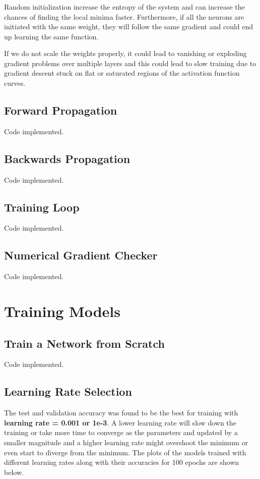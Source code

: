 \documentclass[a4paper]{article}
\begin{document}
\subsubsection{}
Random initialization increase the entropy of the system and can increase the chances of finding the local minima faster. Furthermore, if all the neurons are initiated with the same weight, they will follow the same gradient and could end up learning the same function.

If we do not scale the weights properly, it could lead to vanishing or exploding gradient problems over multiple layers and this could lead to slow training due to gradient descent stuck on flat or saturated regions of the activation function curves.

\subsection{Forward Propagation}
Code implemented.

\subsection{Backwards Propagation}
Code implemented.

\subsection{Training Loop}
Code implemented.

\subsection{Numerical Gradient Checker}
Code implemented.

\section{Training Models}
\subsection{Train a Network from Scratch}
Code implemented.

\subsection{Learning Rate Selection}
The test and validation accuracy was found to be the best for training with \textbf{learning rate = 0.001 or 1e-3}. A lower learning rate will slow down the training or take more time to converge as the parameters and updated by a smaller magnitude and a higher learning rate might overshoot the minimum or even start to diverge from the minimum. The plots of the models trained with different learning rates along with their accuracies for 100 epochs are shown below.\\
\end{document}
